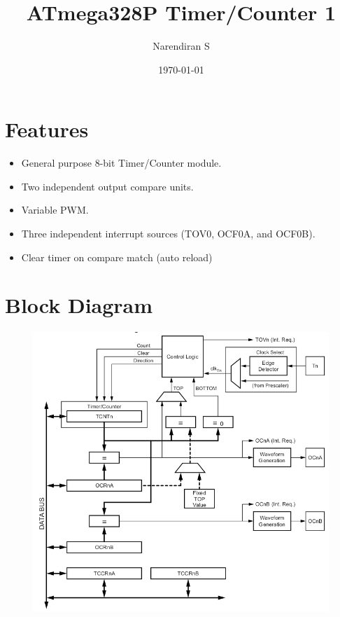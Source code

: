 \documentclass{article}
\title{ATmega328P Timer/Counter 1}
\author{Narendiran S}
\date{\today}
\begin{document}
\maketitle

\section{Features}
\begin{itemize}
    \item General purpose 8-bit Timer/Counter module.
    \item Two independent output compare units.
    \item Variable PWM.
    \item Three independent interrupt sources (TOV0, OCF0A, and OCF0B).
    \item Clear timer on compare match (auto reload)
\end{itemize}

\section{Block Diagram}
\begin{figure}[H]
    \begin{center}
        \includegraphics[height=0.6\textheight]{Timer0BlockDiagram.png}
    \end{center}
\end{figure}
\end{document}
